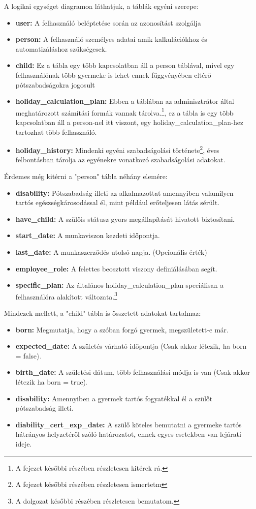 A logikai egységet  diagramon láthatjuk, a táblák egyéni szerepe:
\begin{itemize}
	\item \textbf{user:} A felhasználó beléptetése során az azonosítást szolgálja
	\item \textbf{person:} A felhasználó személyes adatai amik kalkulációkhoz és automatizáláshoz szükségesek.
	\item \textbf{child:} Ez a tábla egy több kapcsolatban áll a person táblával, mivel egy felhasználónak több gyermeke is lehet ennek függvényében eltérő pótszabadságokra jogosult
	\item \textbf{holiday\_calculation\_plan:} Ebben a táblában az adminisztrátor által meghatározott számítási formák vannak tárolva.\footnote{A fejezet későbbi részében részletesen kitérek rá.}, ez a tábla is egy több kapcsolatban áll a person-nel itt viszont, egy holiday\_calculation\_plan-hez tartozhat több felhasználó.
	\item \textbf{holiday\_history:} Mindenki egyéni szabadságolási története\footnote{A fejezet későbbi részében részletesen ismertetm}, éves felbontásban tárolja az egyénekre vonatkozó szabadságolási adatokat. 
\end{itemize} 
Érdemes még kitérni a "person" tábla néhány elemére:
\begin{itemize}
	\item \textbf{disability:} Pótszabadság illeti az alkalmazottat amennyiben valamilyen tartós egészségkárosodással él, mint például erőteljesen látás sérült.
	\item \textbf{have\_child:} A szülőis státusz gyors megállapítását hivatott biztosítani.
	\item \textbf{start\_date:} A munkaviszon kezdeti időpontja.
	\item \textbf{last\_date:} A munkaszerződés utolsó napja. (Opcionális érték)
	\item \textbf{employee\_role:} A felettes beosztott viszony definiálásában segít.
	\item \textbf{specific\_plan:} Az általános holiday\_calculation\_plan speciálisan a felhasználóra alakított változata.\footnote{A dolgozat későbbi részében részletesen bemutatom.}
\end{itemize}

Mindezek mellett, a "child" tábla is összetett adatokat tartalmaz:
\begin{itemize}
	\item \textbf{born:} Megmutatja, hogy a szóban forgó gyermek, megszületett-e már.
	\item \textbf{expected\_date:} A születés várható időpontja (Csak akkor létezik, ha born = false).
	\item \textbf{birth\_date:} A születési dátum, több felhasználási módja is van (Csak akkor létezik ha born = true).
	\item \textbf{disability:} Amennyiben a gyermek tartós fogyatékkal él a szülőt pótszabadság illeti.
	\item \textbf{diability\_cert\_exp\_date:} A szülő köteles bemutatni a gyermeke tartós hátrányos helyzetéről szóló határozatot, ennek egyes esetekben van lejárati ideje.
\end{itemize}

